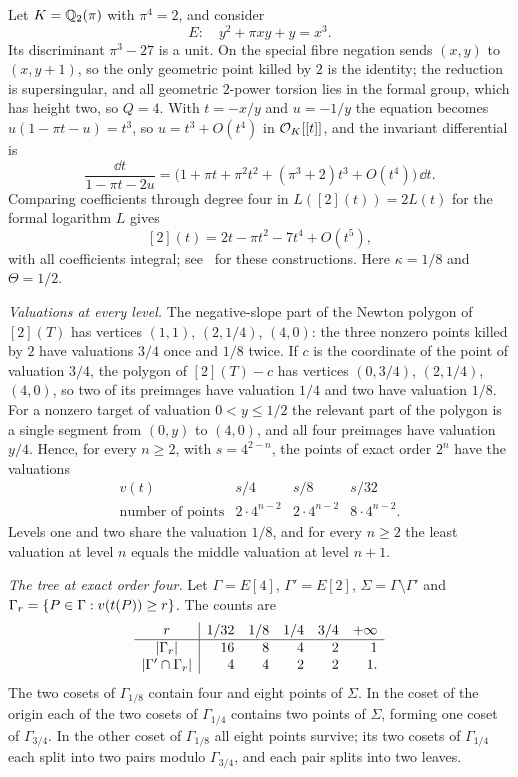 \begin{example}\label{cost:ex:elliptic}
Let $K=\mathbb{Q}_2(\pi)$ with $\pi^4=2$, and consider
\[
 E\colon\quad y^2+\pi xy+y=x^3 .
\]
Its discriminant $\pi^3-27$ is a unit. On the special fibre negation sends $(x,y)$ to
$(x,y+1)$, so the only geometric point killed by $2$ is the identity; the reduction is
supersingular, and all geometric $2$-power torsion lies in the formal group, which has
height two, so $Q=4$. With $t=-x/y$ and $u=-1/y$ the equation becomes
$u(1-\pi t-u)=t^3$, so $u=t^3+O(t^4)$ in $\mathcal{O}_K[[t]]$, and the invariant differential is
\[
 \frac{\dd t}{1-\pi t-2u}=\bigl(1+\pi t+\pi^2t^2+(\pi^3+2)t^3+O(t^4)\bigr)\,\dd t.
\]
Comparing coefficients through degree four in $L([2](t))=2L(t)$ for the formal logarithm
$L$ gives
\[
 [2](t)=2t-\pi t^2-7t^4+O(t^5),
\]
with all coefficients integral; see~\cite[Ch.~IV, \S\S1--5]{Silverman2009Arithmetic} for
these constructions. Here $\kappa=1/8$ and $\Theta=1/2$.

\emph{Valuations at every level.} The negative-slope part of the Newton polygon of
$[2](T)$ has vertices $(1,1)$, $(2,1/4)$, $(4,0)$: the three nonzero points killed by $2$
have valuations $3/4$ once and $1/8$ twice. If $c$ is the coordinate of the point of
valuation $3/4$, the polygon of $[2](T)-c$ has vertices $(0,3/4)$, $(2,1/4)$, $(4,0)$, so
two of its preimages have valuation $1/4$ and two have valuation $1/8$. For a nonzero target
of valuation $0<y\le1/2$ the relevant part of the polygon is a single segment from $(0,y)$
to $(4,0)$, and all four preimages have valuation $y/4$. Hence, for every $n\ge2$, with
$s=4^{2-n}$, the points of exact order $2^n$ have the valuations
\[
\begin{array}{c|ccc}
v(t) & s/4 & s/8 & s/32 \\
\hline
\text{number of points} & 2\cdot4^{n-2}&2\cdot4^{n-2}&8\cdot4^{n-2}.
\end{array}
\]
Levels one and two share the valuation $1/8$, and for every $n\ge2$ the least valuation at
level $n$ equals the middle valuation at level $n+1$.

\emph{The tree at exact order four.} Let $\Gamma=E[4]$, $\Gamma'=E[2]$,
$\Sigma=\Gamma\setminus\Gamma'$ and $\Gamma_r=\{P\in\Gamma:v(t(P))\ge r\}$. The counts are
\[
\begin{array}{c|rrrrr}
r & 1/32 & 1/8 & 1/4 & 3/4 & +\infty\\
\hline
\lvert\Gamma_r\rvert       &16&8&4&2&1\\
\lvert\Gamma'\cap\Gamma_r\rvert &4&4&2&2&1 .
\end{array}
\]
The two cosets of $\Gamma_{1/8}$ contain four and eight points of $\Sigma$. In the coset of
the origin each of the two cosets of $\Gamma_{1/4}$ contains two points of $\Sigma$, forming
one coset of $\Gamma_{3/4}$. In the other coset of $\Gamma_{1/8}$ all eight points survive;
its two cosets of $\Gamma_{1/4}$ each split into two pairs modulo $\Gamma_{3/4}$, and each
pair splits into two leaves.


\end{example}
